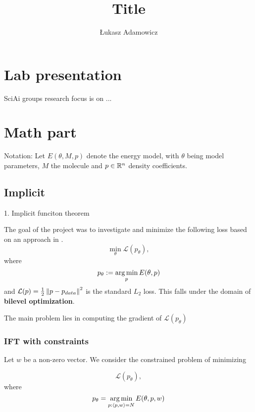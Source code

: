 \documentclass[a4paper,10pt]{report}
\title{Title}
\author{Łukasz Adamowicz}
\begin{document}
\maketitle

\begin{abstract}
\end{abstract}



\section{ Lab presentation}
SciAi groups research focus is on ...

 \section{Math part}
Notation: Let $E(\theta, M ,p)$ denote the energy model, with $\theta$ being model parameters, $M$ the molecule and $p\in \mathbb{R}^n$ density coefficients.

 \subsection{Implicit}
1. Implicit funciton theorem

The goal of the project was to investigate and minimize the following loss based on an approach in \cite{neuralscf}.
\begin{equation}
 \min_\theta \mathcal{L}(p_{\theta}),
\end{equation}
where
\begin{equation}
  p_\theta:=\operatorname*{arg\,min}_p E(\theta,p)
\end{equation}
and $\mathcal{L}(p) = \frac{1}{2}\left\|p-p_{data}\right\|^2$ is the standard $L_2$ loss.
This falls under the domain of \textbf{bilevel optimization}.

The main problem lies in computing the gradient of $\mathcal{L}(p_\theta)$


\subsubsection{ IFT with constraints}
Let $w$ be a non-zero vector.
We consider the constrained problem of minimizing

\begin{equation}
 \mathcal{L}(p_\theta),
\end{equation}
where
\begin{equation}
 p_\theta = \operatorname*{arg\,min}_{p: \langle p, w \rangle=N} E(\theta, p, w)
\end{equation}
\end{document}
